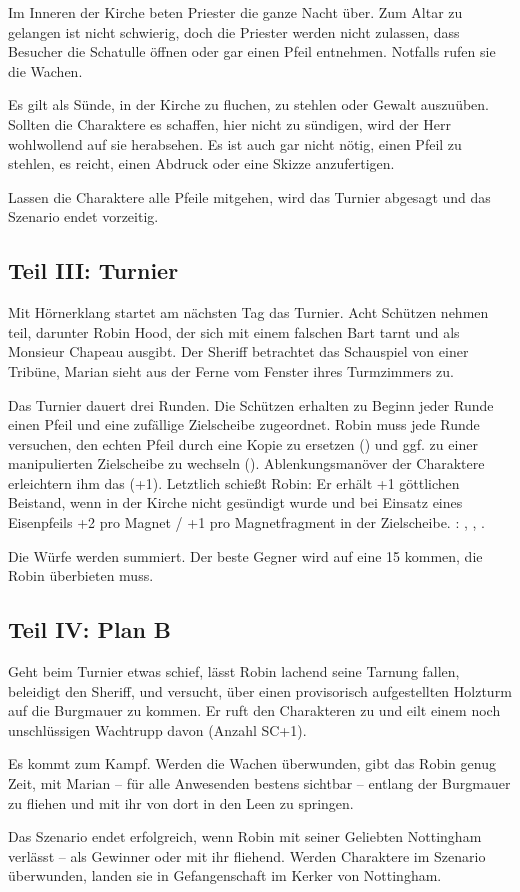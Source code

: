 {		Im Inneren der Kirche beten Priester die ganze Nacht über. Zum Altar zu gelangen ist nicht schwierig, doch die Priester werden nicht zulassen, dass Besucher die Schatulle öffnen oder gar einen Pfeil entnehmen. Notfalls rufen sie die Wachen.

		Es gilt als Sünde, in der Kirche zu fluchen, zu stehlen oder Gewalt auszuüben. Sollten die Charaktere es schaffen, hier nicht zu sündigen, wird der Herr wohlwollend auf sie herabsehen. Es ist auch gar nicht nötig, einen Pfeil zu stehlen, es reicht, einen Abdruck oder eine Skizze anzufertigen.

		Lassen die Charaktere alle Pfeile mitgehen, wird das Turnier abgesagt und das Szenario endet vorzeitig.

		\subsection{Teil III: Turnier}

		Mit Hörnerklang startet am nächsten Tag das Turnier. Acht Schützen nehmen teil, darunter Robin Hood, der sich mit einem falschen Bart tarnt und als Monsieur Chapeau ausgibt. Der Sheriff betrachtet das Schauspiel von einer Tribüne, Marian sieht aus der Ferne vom Fenster ihres Turmzimmers zu.

		Das Turnier dauert drei Runden. Die Schützen erhalten zu Beginn jeder Runde einen Pfeil und eine zufällige Zielscheibe zugeordnet. Robin muss jede Runde versuchen, den echten Pfeil durch eine Kopie zu ersetzen () und ggf. zu einer manipulierten Zielscheibe zu wechseln (). Ablenkungsmanöver der Charaktere erleichtern ihm das (+1). Letztlich schießt Robin: Er erhält +1 göttlichen Beistand, wenn in der Kirche nicht gesündigt wurde und bei Einsatz eines Eisenpfeils +2 pro Magnet / +1 pro Magnetfragment in der Zielscheibe. : , , .

		Die Würfe werden summiert. Der beste Gegner wird auf eine 15 kommen, die Robin überbieten muss.

		\subsection{Teil IV: Plan B}

		Geht beim Turnier etwas schief, lässt Robin lachend seine Tarnung fallen, beleidigt den Sheriff, und versucht, über einen provisorisch aufgestellten Holzturm auf die Burgmauer zu kommen. Er ruft den Charakteren  zu und eilt einem noch unschlüssigen Wachtrupp davon (Anzahl SC+1).

		Es kommt zum Kampf. Werden die Wachen überwunden, gibt das Robin genug Zeit, mit Marian -- für alle Anwesenden bestens sichtbar -- entlang der Burgmauer zu fliehen und mit ihr von dort in den Leen zu springen.


		\noindent
		Das Szenario endet erfolgreich, wenn Robin mit seiner Geliebten Nottingham verlässt -- als Gewinner oder mit ihr fliehend. Werden Charaktere im Szenario überwunden, landen sie in Gefangenschaft im Kerker von Nottingham.
}
